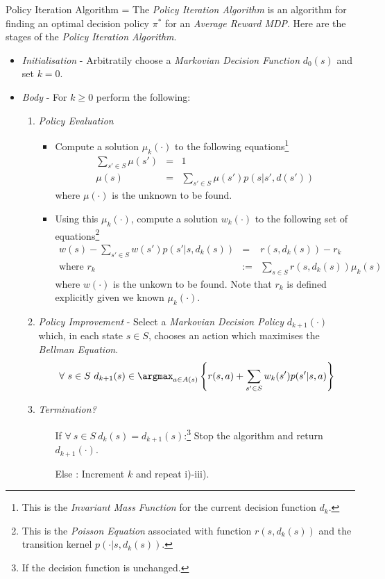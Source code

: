 \documentclass[11pt,a4paper]{article}
\begin{document}
  \begin{definition}{Policy Iteration Algorithm}
    \everymath={\displaystyle}
    The \textit{Policy Iteration Algorithm} is an algorithm for finding an optimal decision policy $\pi^*$ for an \textit{Average Reward MDP}. Here are the stages of the \textit{Policy Iteration Algorithm}.
    \begin{itemize}
      \item \textit{Initialisation} - Arbitratily choose a \textit{Markovian Decision Function} $d_0(s)$ and set $k=0.$
      \item \textit{Body} - For $k\geq0$ perform the following:
      \begin{enumerate}
        \item \textit{Policy Evaluation}
        \begin{itemize}
          \item Compute a solution $\mu_k(\cdot)$ to the following equations\footnote{This is the \textit{Invariant Mass Function} for the current decision function $d_k$.}
          \[\begin{array}{rcl}
            \sum_{s'\in S}\mu(s')&=&1\\
            \mu(s)&=&\sum_{s'\in S}\mu(s')p(s|s',d(s'))
          \end{array}\]
          where $\mu(\cdot)$ is the unknown to be found.
          \item Using this $\mu_k(\cdot)$, compute a solution $w_k(\cdot)$ to the following set of equations\footnote{This is the \textit{Poisson Equation} associated with function $r(s,d_k(s))$ and the transition kernel $p(\cdot|s,d_k(s))$.}
          \[\begin{array}{rll}
            w(s)-\sum_{s'\in S}w(s')p(s'|s,d_k(s))&=&r(s,d_k(s))-r_k\\
            \text{where }r_k&:=&\sum_{s\in S}r(s,d_k(s))\mu_k(s)
          \end{array}\]
          where $w(\cdot)$ is the unkown to be found. Note that $r_k$ is defined explicitly given we known $\mu_k(\cdot)$.
        \end{itemize}
        \item \textit{Policy Improvement} - Select a \textit{Markovian Decision Policy} $d_{k+1}(\cdot)$ which, in each state $s\in S$, chooses an action which maximises the \textit{Bellman Equation}.
        \[ \forall\ s\in S\ d_{k+1}(s)\in\argmax_{a\in A(s)}\left\{r(s,a)+\sum_{s'\in S}w_k(s')p(s'|s,a)\right\} \]
        \item \textit{Termination?}
        \begin{itemize}
          \item[If] $\forall\ s\in S\ d_k(s)=d_{k+1}(s)$:\footnote{If the decision function is unchanged.} Stop the algorithm and return $d_{k+1}(\cdot)$.
          \item[Else]: Increment $k$ and repeat i)-iii).
        \end{itemize}
      \end{enumerate}
    \end{itemize}
  \end{definition}
\end{document}
